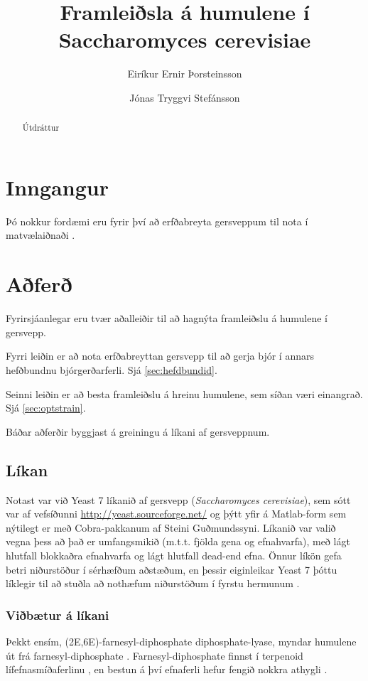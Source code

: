 \documentclass[12pt]{article}
\title{Framleiðsla á humulene í Saccharomyces cerevisiae}
\author{Eiríkur Ernir Þorsteinsson \and Jónas Tryggvi Stefánsson}
\begin{document}
\maketitle

\begin{abstract}
Útdráttur
\end{abstract}


\section{Inngangur}

Þó nokkur fordæmi eru fyrir því að erfðabreyta gersveppum til nota í matvælaiðnaði \cite{dequin2001potential}.

\section{Aðferð}
Fyrirsjáanlegar eru tvær aðalleiðir til að hagnýta framleiðslu á humulene í gersvepp.

Fyrri leiðin er að nota erfðabreyttan gersvepp til að gerja bjór í annars hefðbundnu bjórgerðarferli. Sjá \ref{sec:hefdbundid}.

Seinni leiðin er að besta framleiðslu á hreinu humulene, sem síðan væri einangrað. Sjá \ref{sec:optstrain}.

Báðar aðferðir byggjast á greiningu á líkani af gersveppnum.
\subsection{Líkan}
Notast var við Yeast 7 líkanið af gersvepp (\emph{Saccharomyces cerevisiae}), sem sótt var af vefsíðunni \url{http://yeast.sourceforge.net/} og þýtt yfir á Matlab-form sem nýtilegt er með Cobra-pakkanum af Steini Guðmundssyni. Líkanið var valið vegna þess að það er umfangsmikið (m.t.t. fjölda gena og efnahvarfa), með lágt hlutfall blokkaðra efnahvarfa og lágt hlutfall dead-end efna. Önnur líkön gefa betri niðurstöður í sérhæfðum aðstæðum, en þessir eiginleikar Yeast 7 þóttu líklegir til að stuðla að nothæfum niðurstöðum í fyrstu hermunum \cite{heavner2015comparative}.

\subsubsection{Viðbætur á líkani}
Þekkt ensím, (2E,6E)-farnesyl-diphosphate diphosphate-lyase, myndar humulene út frá farnesyl-diphosphate \cite[KEGG: R08373]{Kanehisa01012000}. Farnesyl-diphosphate finnst í terpenoid lífefnasmíðaferlinu \cite[KEGG: rn00900]{Kanehisa01012000}, en bestun á því efnaferli hefur fengið nokkra athygli \cite{BIT:BIT21216,misawa2011pathway,asadollahi2008production}.
\end{document}
